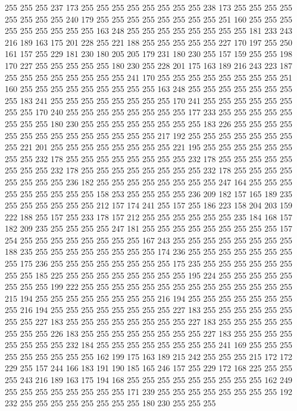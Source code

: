 255 255 255 237 173 255 255 255 255 255 255 255 255 238 173 255 255 255 255 255
255 255 255 240 179 255 255 255 255 255 255 255 255 251 160 255 255 255 255 255
255 255 255 255 163 248 255 255 255 255 255 255 255 255 181 233 243 216 189 163
175 201 228 255 221 188 255 255 255 255 255 227 170 197 255 250 161 157 255 229
181 230 180 205 205 179 231 180 230 255 157 159 255 255 198 170 227 255 255 255
255 255 180 230 255 228 201 175 163 189 216 243 223 187 255 255 255 255 255 255
255 255 241 170 255 255 255 255 255 255 255 255 251 160 255 255 255 255 255 255
255 255 255 163 248 255 255 255 255 255 255 255 255 183 241 255 255 255 255 255
255 255 255 170 241 255 255 255 255 255 255 255 255 170 240 255 255 255 255 255
255 255 255 177 233 255 255 255 255 255 255 255 255 180 230 255 255 255 255 255
255 255 255 183 226 255 255 255 255 255 255 255 255 255 255 255 255 255 255 217
192 255 255 255 255 255 255 255 255 221 201 255 255 255 255 255 255 255 255 221
195 255 255 255 255 255 255 255 255 232 178 255 255 255 255 255 255 255 255 232
178 255 255 255 255 255 255 255 255 232 178 255 255 255 255 255 255 255 255 232
178 255 255 255 255 255 255 255 255 236 182 255 255 255 255 255 255 255 255 247
164 255 255 255 255 255 255 255 255 255 158 253 255 255 255 255 236 209 182 157
165 189 235 255 255 255 255 255 255 212 157 174 241 255 157 255 186 223 158 204
203 159 222 188 255 157 255 233 178 157 212 255 255 255 255 255 255 235 184 168
157 182 209 235 255 255 255 255 247 181 255 255 255 255 255 255 255 255 255 157
254 255 255 255 255 255 255 255 255 167 243 255 255 255 255 255 255 255 255 188
235 255 255 255 255 255 255 255 255 174 236 255 255 255 255 255 255 255 255 175
236 255 255 255 255 255 255 255 255 175 235 255 255 255 255 255 255 255 255 185
225 255 255 255 255 255 255 255 255 195 224 255 255 255 255 255 255 255 255 199
222 255 255 255 255 255 255 255 255 255 255 255 255 255 255 215 194 255 255 255
255 255 255 255 255 216 194 255 255 255 255 255 255 255 255 216 194 255 255 255
255 255 255 255 255 227 183 255 255 255 255 255 255 255 255 227 183 255 255 255
255 255 255 255 255 227 183 255 255 255 255 255 255 255 255 226 183 255 255 255
255 255 255 255 255 227 183 255 255 255 255 255 255 255 255 232 184 255 255 255
255 255 255 255 255 241 169 255 255 255 255 255 255 255 255 255 162 199 175 163
189 215 242 255 255 255 215 172 172 229 255 157 244 166 183 191 190 185 165 246
157 255 229 172 168 225 255 255 255 243 216 189 163 175 194 168 255 255 255 255
255 255 255 255 255 162 249 255 255 255 255 255 255 255 255 171 239 255 255 255
255 255 255 255 255 192 232 255 255 255 255 255 255 255 255 180 230 255 255 255
